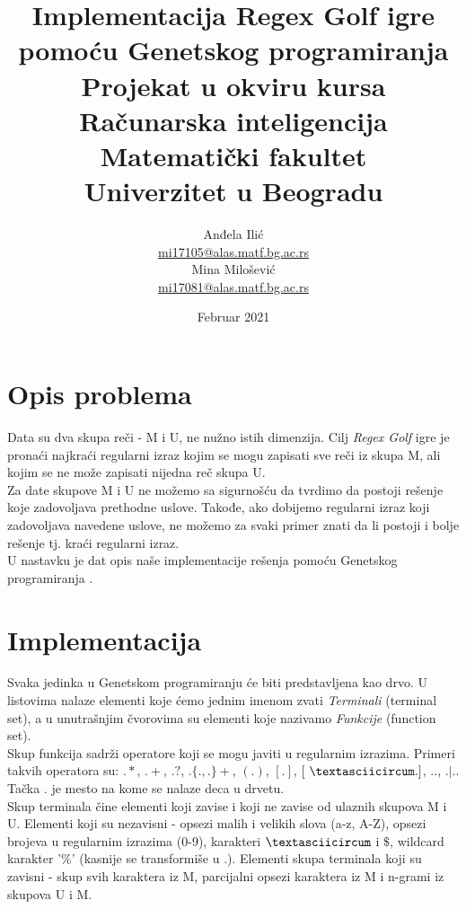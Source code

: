 \documentclass{article}
\title{%
  Implementacija Regex Golf igre pomoću Genetskog programiranja \vspace{0.4cm} \\ 
  \large Projekat u okviru kursa Računarska inteligencija \\
  Matematički fakultet\\ Univerzitet u Beogradu \vspace*{0.5cm}}
\author{Anđela Ilić \\
\href{mailto:mi17105@alas.matf.bg.ac.rs}{mi17105@alas.matf.bg.ac.rs} \\
Mina Milošević \\
\href{mailto:mi17081@alas.matf.bg.ac.rs}{mi17081@alas.matf.bg.ac.rs} \\
}
\date{\vspace*{1cm}Februar 2021}
\begin{document}
\maketitle

\newpage

\renewcommand*\contentsname{Sadržaj}
\tableofcontents
\newpage

\section{Opis problema}
Data su dva skupa reči - M i U, ne nužno istih dimenzija. Cilj \textit{Regex Golf} igre je pronaći najkraći regularni izraz kojim se mogu zapisati sve reči iz skupa M, ali kojim se ne može zapisati nijedna reč skupa U.\\
Za date skupove M i U ne možemo sa sigurnošću da tvrdimo da postoji rešenje koje zadovoljava prethodne uslove. Takođe, ako dobijemo regularni izraz koji zadovoljava navedene uslove, ne možemo za svaki primer znati da li postoji i bolje rešenje tj. kraći regularni izraz. \\
U nastavku je dat opis naše implementacije rešenja pomoću Genetskog programiranja \cite{Bartoli}.

\section{Implementacija}
Svaka jedinka u Genetskom programiranju će biti predstavljena kao drvo.
U listovima nalaze elementi koje ćemo jednim imenom zvati \textit{Terminali} (terminal set), a u unutrašnjim čvorovima su elementi koje nazivamo \textit{Funkcije} (function set). \\
Skup funkcija sadrži operatore koji se mogu javiti u regularnim izrazima. Primeri takvih operatora su: $.*$, $.+$, $.?$, $.\{.,.\}+$, $(.)$, $[.]$,
$[\ \textasciicircum .]$, $..$, $.|.$. Tačka $.$ je mesto na kome se nalaze
deca u drvetu. \\
Skup terminala čine elementi koji zavise i koji ne zavise od ulaznih skupova M i U. Elementi koji su nezavisni - opsezi malih i velikih slova (a-z, A-Z), opsezi brojeva u
regularnim izrazima (0-9), karakteri $\textasciicircum$ i $\$$, wildcard karakter
'$\%$' (kasnije se transformiše u .). Elementi skupa terminala koji su zavisni - skup svih karaktera iz M, parcijalni opsezi karaktera iz M i n-grami iz skupova U i M.
\end{document}
